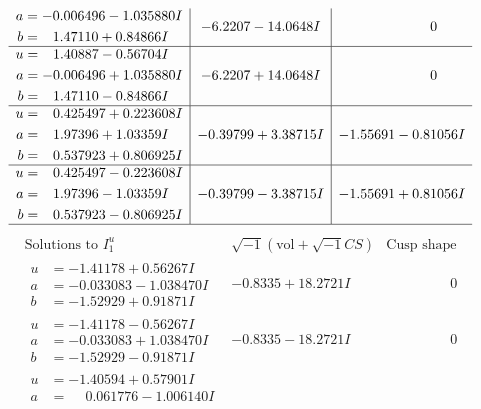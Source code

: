 \documentclass[1p]{elsarticle_modified}
\theoremstyle{definition}
\newcommand{\I}{\sqrt{-1}}
\begin{document}
$$\begin{array}{c|c|c}
\begin{aligned}
a &= -0.006496 - 1.035880 I \\
b &= \phantom{-}1.47110 + 0.84866 I\end{aligned}
 & -6.2207 - 14.0648 I & \phantom{-0.000000 } 0 \\ \hline\begin{aligned}
u &= \phantom{-}1.40887 - 0.56704 I \\
a &= -0.006496 + 1.035880 I \\
b &= \phantom{-}1.47110 - 0.84866 I\end{aligned}
 & -6.2207 + 14.0648 I & \phantom{-0.000000 } 0 \\ \hline\begin{aligned}
u &= \phantom{-}0.425497 + 0.223608 I \\
a &= \phantom{-}1.97396 + 1.03359 I \\
b &= \phantom{-}0.537923 + 0.806925 I\end{aligned}
 & -0.39799 + 3.38715 I & -1.55691 - 0.81056 I \\ \hline\begin{aligned}
u &= \phantom{-}0.425497 - 0.223608 I \\
a &= \phantom{-}1.97396 - 1.03359 I \\
b &= \phantom{-}0.537923 - 0.806925 I\end{aligned}
 & -0.39799 - 3.38715 I & -1.55691 + 0.81056 I\\
 \hline 
 \end{array}$$\newpage$$\begin{array}{c|c|c}  
\text{Solutions to }I^u_{1}& \I (\text{vol} + \sqrt{-1}CS) & \text{Cusp shape}\\
 \hline 
\begin{aligned}
u &= -1.41178 + 0.56267 I \\
a &= -0.033083 - 1.038470 I \\
b &= -1.52929 + 0.91871 I\end{aligned}
 & -0.8335 + 18.2721 I & \phantom{-0.000000 } 0 \\ \hline\begin{aligned}
u &= -1.41178 - 0.56267 I \\
a &= -0.033083 + 1.038470 I \\
b &= -1.52929 - 0.91871 I\end{aligned}
 & -0.8335 - 18.2721 I & \phantom{-0.000000 } 0 \\ \hline\begin{aligned}
u &= -1.40594 + 0.57901 I \\
a &= \phantom{-}0.061776 - 1.006140 I \\

\end{aligned}
\end{array}$$
\end{document}
